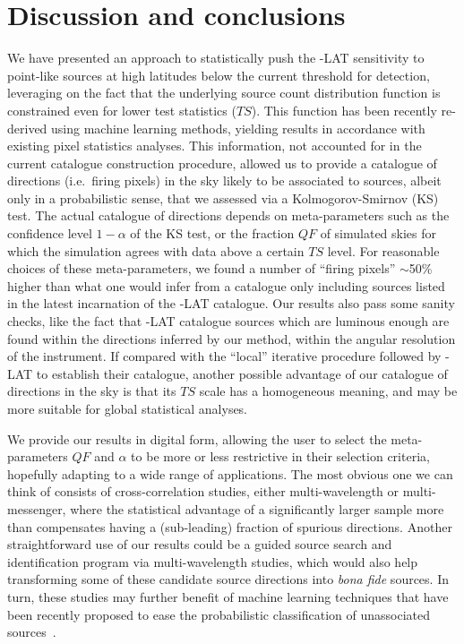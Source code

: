 \section{Discussion and conclusions}
\label{sec:catalog:conclusions}


We have presented an approach to statistically push the \Fermi-LAT sensitivity to point-like sources at high latitudes below  the current threshold for detection, leveraging on the fact that the underlying source count  distribution function is constrained even for lower test statistics ($TS$). This function has been recently re-derived using machine learning methods, yielding results in  accordance with existing pixel statistics analyses. This information, not accounted for in the current catalogue construction procedure, allowed us to provide a catalogue of directions (i.e.~firing pixels) in the sky likely to be associated to sources, albeit only in a probabilistic sense, that we assessed via a Kolmogorov-Smirnov (KS) test. The actual catalogue of directions depends on meta-parameters such as the confidence level $1-\alpha$ of the KS test, or the fraction $QF$ of simulated skies for which the simulation agrees with data above a certain $TS$ level. For reasonable choices of these meta-parameters, we found a number of ``firing pixels'' $\sim$50\%  higher than what one would infer from a catalogue only including sources listed in the latest incarnation of the \Fermi-LAT catalogue. Our results also pass some sanity checks, like the fact that \Fermi-LAT catalogue sources which are luminous enough are found within the directions inferred by our method, within the angular resolution of the instrument. If compared with the ``local'' iterative procedure followed by \Fermi-LAT to establish their catalogue, another possible advantage of our catalogue of directions in the sky is that its $TS$ scale has a homogeneous meaning, and may be more suitable for global statistical analyses.  

We provide our results in digital form, allowing the user to select the meta-parameters $QF$ and $\alpha$ to be more or less restrictive in their selection criteria, hopefully adapting to a wide range of applications. The most obvious one we can think of consists of cross-correlation studies, either multi-wavelength or multi-messenger, where the statistical advantage of  a significantly larger sample more than compensates having a (sub-leading) fraction of spurious directions. 
Another straightforward use of our results could be a guided source search and identification program via multi-wavelength studies, which would also help transforming some of these candidate source directions into  \textit{bona fide} sources. In turn, these studies may further benefit of machine learning techniques that have been recently proposed to ease the  probabilistic classification of unassociated sources~\cite{Bhat:2021wtb}.

